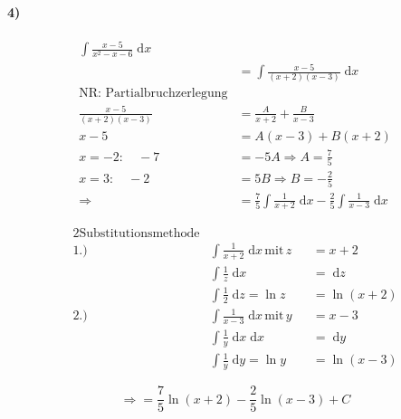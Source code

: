 \paragraph{4)}

\begin{align*}
    \int \frac{x-5}{x^2 - x - 6} \;\mathrm{d}x \\
    &= \int \frac{x-5}{(x+2)(x-3)} \;\mathrm{d}x \\
    \text{NR: Partialbruchzerlegung} \\
    \frac{x-5}{(x+2)(x-3)} &= \frac{A}{x+2} + \frac{B}{x-3} \\
    x-5 &= A(x-3) + B(x+2) \\
    x=-2:\quad -7 &= -5A \Rightarrow A = \frac{7}{5} \\
    x=3:\quad -2 &= 5B \Rightarrow B = -\frac{2}{5} \\
    \Rightarrow &= \frac{7}{5} \int \frac{1}{x+2} \;\mathrm{d}x - \frac{2}{5} \int \frac{1}{x-3} \;\mathrm{d}x
\end{align*}


\begin{alignat*}{2}
    \text{Substitutionsmethode} \\
    \text{1.)}\quad &\int \frac{1}{x+2} \;\mathrm{d}x \,\text{mit}\, z &&= x + 2 \\
    &\int \frac{1}{z} \;\mathrm{d}x &&= \;\mathrm{d}z \\
    &\int \frac{1}{2} \;\mathrm{d}z = \ln z &&= \ln (x + 2) \\
    \text{2.)}\quad &\int \frac{1}{x-3} \;\mathrm{d}x \,\text{mit}\, y &&= x - 3 \\
    &\int \frac{1}{y} \;\mathrm{d}x \;\mathrm{d}x &&= \;\mathrm{d}y \\
    &\int \frac{1}{y} \;\mathrm{d}y = \ln y &&= \ln(x-3)
\end{alignat*}

\[
    \Rightarrow = \frac{7}{5} \ln(x+2) - \frac{2}{5} \ln(x-3) + C 
\]
    